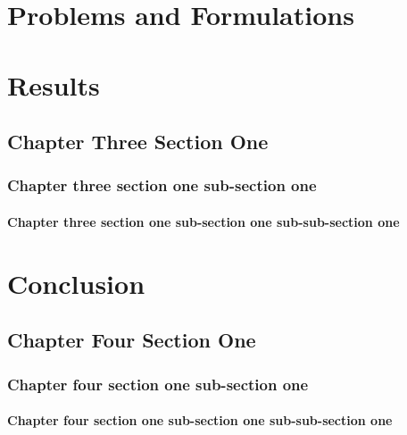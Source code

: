 


\chapter{Problems and Formulations}

\chapter{Results}
\section{Chapter Three Section One}
\subsection{Chapter three section one sub-section one}
\subsubsection{Chapter three section one sub-section one sub-sub-section one}


\chapter{Conclusion}
\section{Chapter Four Section One}
\subsection{Chapter four section one sub-section one}
\subsubsection{Chapter four section one sub-section one sub-sub-section one}

